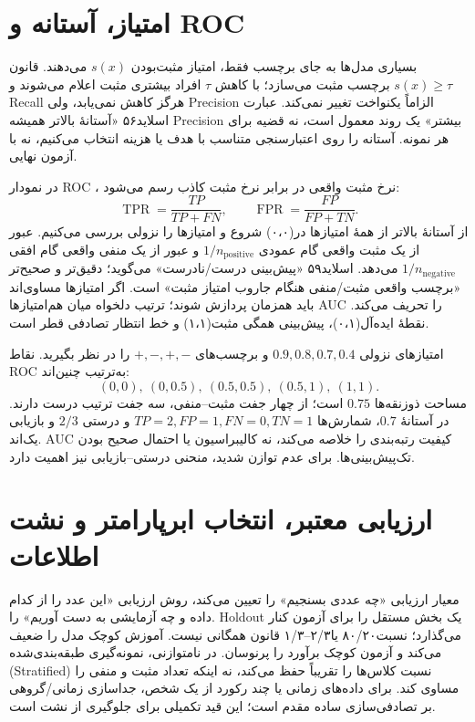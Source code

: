\documentclass[12pt,a4paper,oneside]{report}
\newcounter{ex}[chapter]
\newenvironment{example}[1]{\refstepcounter{ex}\begin{tcolorbox}[breakable=false,title={مثال \thechapter.\arabic{ex} | #1},colframe=muted,colback=white]}{\end{tcolorbox}}
\begin{document}
\section{امتیاز، آستانه و ROC}

بسیاری مدل‌ها به جای برچسب فقط، امتیاز مثبت‌بودن $s(x)$ می‌دهند. قانون $s(x)\ge\tau$ برچسب مثبت می‌سازد؛ با کاهش $\tau$ افراد بیشتری مثبت اعلام می‌شوند و Recall هرگز کاهش نمی‌یابد، ولی Precision الزاماً یکنواخت تغییر نمی‌کند. عبارت اسلاید۵۶ «آستانهٔ بالاتر همیشه Precision بیشتر» یک روند معمول است، نه قضیه برای هر نمونه. آستانه را روی اعتبارسنجی متناسب با هدف یا هزینه انتخاب می‌کنیم، نه با آزمون نهایی.

در نمودار ROC ، نرخ مثبت واقعی در برابر نرخ مثبت کاذب رسم می‌شود:\[\operatorname{TPR}=\frac{TP}{TP+FN},\qquad\operatorname{FPR}=\frac{FP}{FP+TN}.\] از آستانهٔ بالاتر از همهٔ امتیازها در(۰،۰) شروع و امتیازها را نزولی بررسی می‌کنیم. عبور از یک مثبت واقعی گام عمودی $1/n_{\mathrm{positive}}$ و عبور از یک منفی واقعی گام افقی $1/n_{\mathrm{negative}}$ می‌دهد. اسلاید۵۹ «پیش‌بینی درست/نادرست» می‌گوید؛ دقیق‌تر و صحیح‌تر «برچسب واقعی مثبت/منفی هنگام جاروب امتیاز مثبت» است. اگر امتیازها مساوی‌اند باید همزمان پردازش شوند؛ ترتیب دلخواه میان هم‌امتیازها AUC را تحریف می‌کند. نقطهٔ ایده‌آل(۰،۱)، پیش‌بینی همگی مثبت(۱،۱) و خط انتظار تصادفی قطر است.

\begin{example}{محاسبهٔ ROC با چهار مشاهده}
امتیازهای نزولی $0.9,0.8,0.7,0.4$ و برچسب‌های $+,-,+,-$ را در نظر بگیرید. نقاط ROC به‌ترتیب چنین‌اند:
\[(0,0),\ (0,0.5),\ (0.5,0.5),\ (0.5,1),\ (1,1).\]
مساحت ذوزنقه‌ها $0.75$ است؛ از چهار جفت مثبت–منفی، سه جفت ترتیب درست دارند. در آستانهٔ $0.7$، شمارش‌ها $TP=2,FP=1,FN=0,TN=1$ و درستی $2/3$ و بازیابی یک‌اند. AUC کیفیت رتبه‌بندی را خلاصه می‌کند، نه کالیبراسیون یا احتمال صحیح بودن تک‌پیش‌بینی‌ها. برای عدم توازن شدید، منحنی درستی–بازیابی نیز اهمیت دارد.
\end{example}



\section{ارزیابی معتبر، انتخاب ابرپارامتر و نشت اطلاعات}

معیار ارزیابی «چه عددی بسنجیم» را تعیین می‌کند، روش ارزیابی «این عدد را از کدام داده و چه آزمایشی به دست آوریم» را. Holdout یک بخش مستقل را برای آزمون کنار می‌گذارد؛ نسبت۸۰/۲۰ یا۲/۳--۱/۳ قانون همگانی نیست. آموزش کوچک مدل را ضعیف می‌کند و آزمون کوچک برآورد را پرنوسان. در نامتوازنی، نمونه‌گیری طبقه‌بندی‌شده (Stratified) نسبت کلاس‌ها را تقریباً حفظ می‌کند، نه اینکه تعداد مثبت و منفی را مساوی کند. برای داده‌های زمانی یا چند رکورد از یک شخص، جداسازی زمانی/گروهی بر تصادفی‌سازی ساده مقدم است؛ این قید تکمیلی برای جلوگیری از نشت است.
\end{document}
